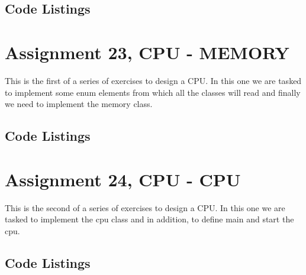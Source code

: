 \documentclass[11pt]{article}
\begin{document}
\subsection*{Code Listings}







\section*{Assignment 23, CPU - MEMORY}
This is the first of a series of exercises to design a CPU. In this one we are tasked to implement some enum elements from which all the classes will read and finally we need to implement the memory class.

\subsection*{Code Listings}







\section*{Assignment 24, CPU - CPU}
This is the second of a series of exercises to design a CPU. In this one we are tasked to implement the cpu class and in addition, to define main and start the cpu.

\subsection*{Code Listings}






\end{document}
